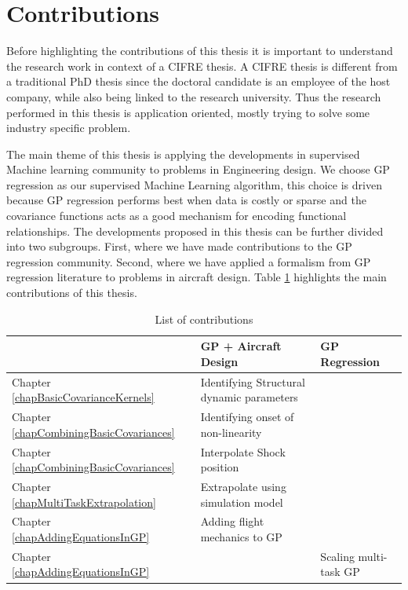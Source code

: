 \section{Contributions}\label{secCh1Contributions}
Before highlighting the contributions of this thesis it is important to understand the research work in context of a CIFRE thesis. A CIFRE thesis is different from a traditional PhD thesis since the doctoral candidate is an employee of the host company, while also being linked to the research university. Thus the research performed in this thesis is application oriented, mostly trying to solve some industry specific problem.

The main theme of this thesis is applying the developments in supervised Machine learning community to problems in  Engineering design. We choose GP regression as our supervised Machine Learning algorithm, this choice is driven because GP regression performs best when data is costly or sparse and the covariance functions acts as a good mechanism for encoding functional relationships. The developments proposed in this thesis can be further divided into two subgroups. First, where we have made contributions to the GP regression community. Second, where we have applied a formalism from GP regression literature to problems in aircraft design. Table \ref{tabListOfContributions} highlights the main contributions of this thesis.

\begin{table}[!ht]
\centering
\begin{tabularx}{\textwidth}{|l|X|X|}
  \hline
  & GP + Aircraft Design & GP Regression \\
  \hline 
  \hline
Chapter \ref{chapBasicCovarianceKernels}& Identifying Structural dynamic parameters \cite{chiplunkar2017operational} &\\
\hline
Chapter \ref{chapCombiningBasicCovariances} & Identifying onset of non-linearity \cite{chiplunkar:hal-01555401} &\\
\hline
Chapter \ref{chapCombiningBasicCovariances} & Interpolate Shock position \cite{oatao18004} &\\
\hline
Chapter \ref{chapMultiTaskExtrapolation} & Extrapolate using simulation model &\\
\hline
Chapter \ref{chapAddingEquationsInGP} & Adding flight mechanics to GP \cite{oatao18001} &\\
\hline
Chapter \ref{chapAddingEquationsInGP} & & Scaling multi-task GP  \cite{icpram16Ankit, oatao18000}  \\
  \hline 
  \end{tabularx}
  \label{tabListOfContributions}
  \caption{List of contributions}
  \end{table}


